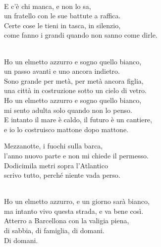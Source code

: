 \begin{lyrics}
\\
E c’è chi manca, e non lo sa,\\
un fratello con le sue battute a raffica.\\
Certe cose le tieni in tasca, in silenzio,\\
come fanno i grandi quando non sanno come dirle.

\\
Ho un elmetto azzurro e sogno quello bianco,\\
un passo avanti e uno ancora indietro.\\
Sono grande per metà, per metà ancora figlia,\\
una città in costruzione sotto un cielo di vetro.\\
Ho un elmetto azzurro e sogno quello bianco,\\
mi sento adulta solo quando non lo penso.\\
E intanto il mare è caldo, il futuro è un cantiere,\\
e io lo costruisco mattone dopo mattone.

Mezzanotte, i fuochi sulla barca,\\
l’anno nuovo parte e non mi chiede il permesso.\\
Dodicimila metri sopra l’Atlantico\\
scrivo tutto, perché niente vada perso.

\\
Ho un elmetto azzurro, e un giorno sarà bianco,\\
ma intanto vivo questa strada, e va bene così.\\
Atterro a Barcellona con la valigia piena,\\
di sabbia, di famiglia, di domani.\\
Di domani.
\end{lyrics}

